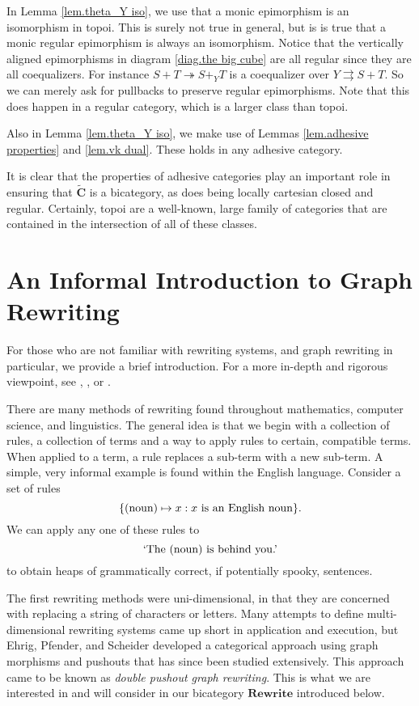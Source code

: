 \documentclass[11pt]{amsart}
\newcommand{\cat}[1]{\mathbf{#1}}
\renewcommand{\t}[1]{\textup{#1}}
\newcommand{\csC}{\widetilde{\mathbf{C}}}
\theoremstyle{remark}
\theoremstyle{definition}
\begin{document}
In Lemma \ref{lem.theta_Y iso}, we use that a monic epimorphism is an isomorphism in topoi. This is surely not true in general, but is is true that a monic regular epimorphism is always an isomorphism.  Notice that the vertically aligned epimorphisms in diagram \eqref{diag.the big cube} are all regular since they are all coequalizers. For instance $S+T \twoheadrightarrow S+_YT$ is a coequalizer over $Y \rightrightarrows S+T$.  So we can merely ask for pullbacks to preserve regular epimorphisms. Note that this does happen in a regular category, which is a larger class than topoi.   

Also in Lemma \ref{lem.theta_Y iso}, we make use of Lemmas \ref{lem.adhesive properties} and \ref{lem.vk dual}.  These holds in any adhesive category. 

It is clear that the properties of adhesive categories play an important role in ensuring that $\csC$ is a bicategory, as does being locally cartesian closed and regular.  Certainly, topoi are a well-known, large family of categories that are contained in the intersection of all of these classes. 
%
%
%
%
%
%
%
%
%
%
%
%
%
%
%
%
%
%
%
\section{An Informal Introduction to Graph Rewriting}  %
\label{sec.Rewriting}
%

For those who are not familiar with rewriting systems, and graph rewriting in particular, we provide a brief introduction. For a more in-depth and rigorous viewpoint, see \cite{Baader_TermRewritingAllThat}, \cite{Ehrig_GraphGramAlgAp}, or \cite{LackSoboc_AdhesiveCategories}.

There are many methods of rewriting found throughout mathematics, computer science, and linguistics. The general idea is that we begin with a collection of rules, a collection of terms and a way to apply rules to certain, compatible terms.  When applied to a term, a rule replaces a sub-term with a new sub-term. A simple, very informal example is found within the English language.  Consider a set of rules 
\[
\{ \t{(noun)} \mapsto x : x \t{ is an 
	English noun} \}.
\]
We can apply any one of these rules to
\[
\t{`The (noun) is behind you.'}
\] 
to obtain heaps of grammatically correct, if potentially spooky, sentences.  

The first rewriting methods were uni-dimensional, in that they are concerned with replacing a string of characters or letters. Many attempts to define multi-dimensional rewriting systems came up short in application and execution, but Ehrig, Pfender, and Scheider developed a categorical approach using graph morphisms and pushouts  \cite{Ehrig_GraphGramAlgAp} that has since been studied extensively. This approach came to be known as \textit{double pushout graph rewriting}. This is what we are interested in and will consider in our bicategory $\cat{Rewrite}$ introduced below.
\end{document}
